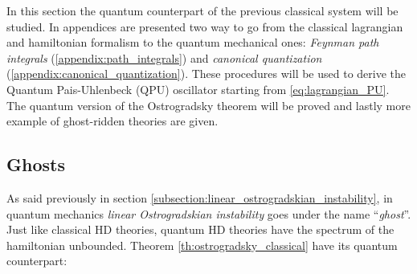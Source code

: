 In this section the quantum counterpart of the previous classical system will be
studied. In appendices are presented two way to go from the classical
lagrangian and hamiltonian formalism to the quantum mechanical ones:
\emph{Feynman path integrals} (\ref{appendix:path_integrals}) and
\emph{canonical quantization} (\ref{appendix:canonical_quantization}). These
procedures will be used to derive the Quantum Pais-Uhlenbeck (QPU) oscillator
starting from \eqref{eq:lagrangian_PU}. The quantum version of the Ostrogradsky
theorem will be proved and lastly more example of ghost-ridden theories are
given.

\subsection{Ghosts}
As said previously in section
\ref{subsection:linear_ostrogradskian_instability}, in quantum mechanics
\emph{linear Ostrogradskian instability} goes under the name ``\emph{ghost}''.
Just like classical HD theories, quantum HD theories have the spectrum of the
hamiltonian unbounded. Theorem \ref{th:ostrogradsky_classical} have its quantum
counterpart:

